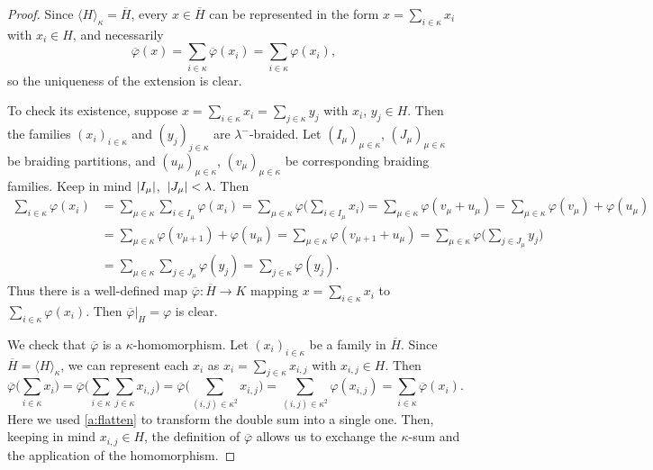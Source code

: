 \documentclass[a4paper,11pt,oneside]{amsart}
\theoremstyle{remark}
\DeclarePairedDelimiter{\card}{\lvert}{\rvert}
\begin{document}
\begin{proof}
  Since $\langle H \rangle_\kappa= \overline{H}$, every $x \in \overline H$ can be represented in the form $x = \sum_{i \in \kappa} x_i$ with $x_i \in H$, and necessarily
  \[
    \overline{\varphi}(x) = \sum_{i \in \kappa} \overline{\varphi}(x_i) = \sum_{i \in \kappa} \varphi(x_i),
  \]
  so the uniqueness of the extension is clear.
  
  To check its existence, suppose $x=\sum_{i \in \kappa} x_i = \sum_{j \in \kappa} y_j$ with $x_i$, $y_j \in H$.
  Then the families $(x_i)_{i\in \kappa}$ and $(y_j)_{j \in \kappa}$ are $\lambda^-$-braided.
  Let $(I_\mu)_{\mu \in \kappa}$, $(J_\mu)_{\mu \in \kappa}$ be braiding partitions, and $(u_\mu)_{\mu \in \kappa}$, $(v_\mu)_{\mu \in \kappa}$ be corresponding braiding families.
  Keep in mind $\card{I_\mu}$,~$\card{J_\mu} < \lambda$.
  Then
  \[
    \begin{split}
    \sum_{i \in \kappa} \varphi(x_i)
    &= \sum_{\mu \in \kappa} \sum_{i \in I_\mu} \varphi(x_i)
    = \sum_{\mu \in \kappa} \varphi\Big( \sum_{i \in I_\mu} x_i\Big)
    = \sum_{\mu \in \kappa} \varphi(v_\mu + u_\mu)
    = \sum_{\mu \in \kappa} \varphi(v_\mu)  + \varphi(u_\mu) \\
    &= \sum_{\mu \in \kappa} \varphi(v_{\mu+1})  + \varphi(u_\mu)
    = \sum_{\mu \in \kappa} \varphi(v_{\mu+1}  + u_\mu)
    = \sum_{\mu \in \kappa} \varphi\Big(\sum_{j \in J_\mu} y_j\Big)  \\
    &= \sum_{\mu \in \kappa} \sum_{j \in J_\mu} \varphi(y_j)
     = \sum_{j \in \kappa} \varphi(y_j).
    \end{split}
  \]
  Thus there is a well-defined map $\overline{\varphi} \colon \overline{H} \to K$ mapping $x=\sum_{i \in \kappa} x_i$ to $\sum_{i \in \kappa} \varphi(x_i)$.
  Then $\overline{\varphi}|_H = \varphi$ is clear.

  We check that $\overline{\varphi}$ is a $\kappa$-homomorphism.
  Let $(x_i)_{i \in \kappa}$ be a family in $\overline{H}$.
  Since $\overline{H} = \langle H \rangle_\kappa$, we can represent each $x_i$ as $x_i = \sum_{j \in\kappa} x_{i,j}$ with $x_{i,j} \in H$.
  Then
  \[
    \overline\varphi\Big(\sum_{i \in \kappa} x_i \Big) = \overline\varphi\Big(\sum_{i \in \kappa} \sum_{j \in \kappa} x_{i,j}\Big) = \overline\varphi\Big(\sum_{(i,j) \in \kappa^2} x_{i,j} \Big) = \sum_{(i,j) \in \kappa^2} \varphi(x_{i,j}) = \sum_{i \in \kappa} \overline{\varphi}(x_i).
  \]
  Here we used \ref{a:flatten} to transform the double sum into a single one. Then, keeping in mind $x_{i,j} \in H$, the definition of $\overline\varphi$ allows us to exchange the $\kappa$-sum and the application of the homomorphism.
\end{proof}
\end{document}
